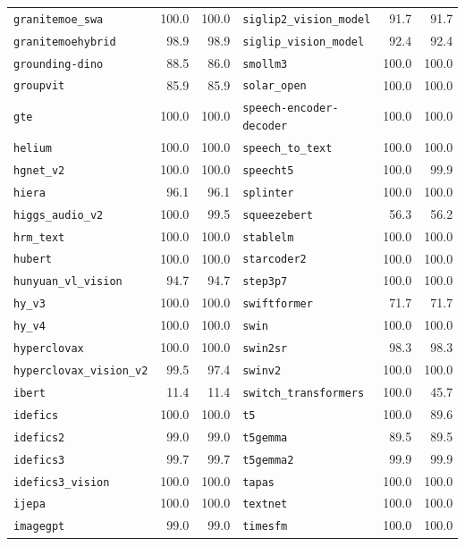 \begin{longtable}{@{}lrr@{\hspace{24pt}}lrr@{}}
\texttt{granitemoe\_swa} & 100.0 & 100.0 & \texttt{siglip2\_vision\_model} & 91.7 & 91.7 \\
\texttt{granitemoehybrid} & 98.9 & 98.9 & \texttt{siglip\_vision\_model} & 92.4 & 92.4 \\
\texttt{grounding-dino} & 88.5 & 86.0 & \texttt{smollm3} & 100.0 & 100.0 \\
\texttt{groupvit} & 85.9 & 85.9 & \texttt{solar\_open} & 100.0 & 100.0 \\
\texttt{gte} & 100.0 & 100.0 & \texttt{speech-encoder-decoder} & 100.0 & 100.0 \\
\texttt{helium} & 100.0 & 100.0 & \texttt{speech\_to\_text} & 100.0 & 100.0 \\
\texttt{hgnet\_v2} & 100.0 & 100.0 & \texttt{speecht5} & 100.0 & 99.9 \\
\texttt{hiera} & 96.1 & 96.1 & \texttt{splinter} & 100.0 & 100.0 \\
\texttt{higgs\_audio\_v2} & 100.0 & 99.5 & \texttt{squeezebert} & 56.3 & 56.2 \\
\texttt{hrm\_text} & 100.0 & 100.0 & \texttt{stablelm} & 100.0 & 100.0 \\
\texttt{hubert} & 100.0 & 100.0 & \texttt{starcoder2} & 100.0 & 100.0 \\
\texttt{hunyuan\_vl\_vision} & 94.7 & 94.7 & \texttt{step3p7} & 100.0 & 100.0 \\
\texttt{hy\_v3} & 100.0 & 100.0 & \texttt{swiftformer} & 71.7 & 71.7 \\
\texttt{hy\_v4} & 100.0 & 100.0 & \texttt{swin} & 100.0 & 100.0 \\
\texttt{hyperclovax} & 100.0 & 100.0 & \texttt{swin2sr} & 98.3 & 98.3 \\
\texttt{hyperclovax\_vision\_v2} & 99.5 & 97.4 & \texttt{swinv2} & 100.0 & 100.0 \\
\texttt{ibert} & 11.4 & 11.4 & \texttt{switch\_transformers} & 100.0 & 45.7 \\
\texttt{idefics} & 100.0 & 100.0 & \texttt{t5} & 100.0 & 89.6 \\
\texttt{idefics2} & 99.0 & 99.0 & \texttt{t5gemma} & 89.5 & 89.5 \\
\texttt{idefics3} & 99.7 & 99.7 & \texttt{t5gemma2} & 99.9 & 99.9 \\
\texttt{idefics3\_vision} & 100.0 & 100.0 & \texttt{tapas} & 100.0 & 100.0 \\
\texttt{ijepa} & 100.0 & 100.0 & \texttt{textnet} & 100.0 & 100.0 \\
\texttt{imagegpt} & 99.0 & 99.0 & \texttt{timesfm} & 100.0 & 100.0 \\

\end{longtable}
